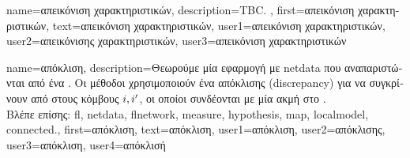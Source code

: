 {name={\foreignlanguage{greek}{απεικόνιση χαρακτηριστικών}}, 
	description={TBC. },
	first={\foreignlanguage{greek}{απεικόνιση χαρακτηριστικών}},
	text={\foreignlanguage{greek}{απεικόνιση χαρακτηριστικών}},
	user1={\foreignlanguage{greek}{απεικόνιση χαρακτηριστικών}}, %
  	user2={\foreignlanguage{greek}{απεικόνισης χαρακτηριστικών}}, %
	user3={\foreignlanguage{greek}{απεικόνιση χαρακτηριστικών}} %
}

{name={\foreignlanguage{greek}{απόκλιση}},
	description={\foreignlanguage{greek}{Θεωρούμε μία εφαρμογή} 
		 \foreignlanguage{greek}{με} \gls{netdata} \foreignlanguage{greek}{που αναπαριστώνται από ένα}
		. \foreignlanguage{greek}{Οι μέθοδοι}  \foreignlanguage{greek}{χρησιμοποιούν 
		ένα}  \foreignlanguage{greek}{απόκλισης} (discrepancy) \foreignlanguage{greek}{για να συγκρίνουν} 
		  \foreignlanguage{greek}{από}  \foreignlanguage{greek}{στους 
		κόμβους} $i,i'$, \foreignlanguage{greek}{οι οποίοι συνδέονται με μία ακμή στο} . 
		\\
		\foreignlanguage{greek}{Βλέπε επίσης:} \gls{fl}, \gls{netdata}, \gls{flnetwork}, \gls{measure}, \gls{hypothesis}, \gls{map}, 
		\gls{localmodel}, \gls{connected}.},
	first={\foreignlanguage{greek}{απόκλιση}},
	text={\foreignlanguage{greek}{απόκλιση}},
	user1={\foreignlanguage{greek}{απόκλιση}}, %
	user2={\foreignlanguage{greek}{απόκλισης}}, %
	user3={\foreignlanguage{greek}{απόκλιση}}, %
	user4={\foreignlanguage{greek}{απόκλισή}} %
}

